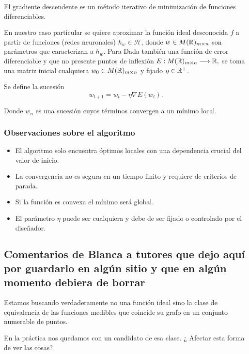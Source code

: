 El gradiente descendente es un método iterativo de minimización de funciones diferenciables. 

En nuestro caso particular se quiere aproximar la función ideal desconocida $f$ a partir de funciones (redes neuronales) $h_w \in \mathcal{H}$, donde $w \in M(\mathbb{R})_{m \times n}$ son parámetros que caracterizan a $h_w$.
Para  
Dada también una función de error diferenciable y que no presente puntos de inflexión
$E: M(\mathbb{R})_{m \times n} \longrightarrow \mathbb{R},$
se toma una matriz inicial  cualquiera $w_0 \in M(\mathbb{R})_{m \times n}$ y 
fijado $\eta \in \mathbb{R}^+$. 

Se define la sucesión 
\begin{equation}
    w_{t+1}  = w_t - \eta \nabla E(w_t).
\end{equation}  

Donde $w_n$ es una sucesión cuyos términos convergen a un mínimo local.
\subsubsection*{Observaciones sobre el algoritmo }

\begin{itemize}
    \item El algoritmo solo encuentra óptimos locales con una dependencia crucial del valor de inicio. 
    \item La convergencia no es segura en un tiempo finito y requiere de criterios de parada. 
    \item Si la función es convexa el mínimo será global.
    \item El parámetro $\eta$ puede ser cualquiera y debe de ser fijado o controlado por el diseñador.  
\end{itemize}


\subsection{Comentarios de Blanca a tutores que dejo aquí por guardarlo en algún sitio y que en algún momento debiera de borrar} 


Estamos buscando verdaderamente no una función ideal sino 
la clase de equivalencia de las funciones medibles que coincide su grafo en un conjunto numerable de puntos. 

En la práctica nos quedamos con un candidato de esa clase. ¿ Afectar esta forma de ver las cosas?
